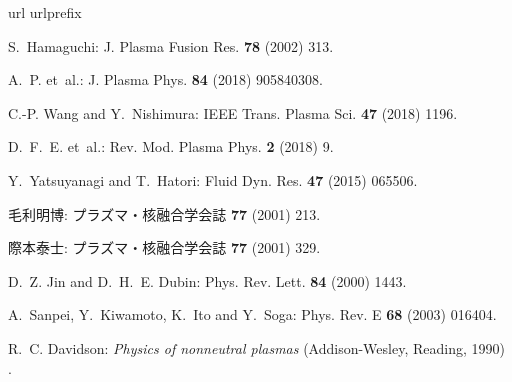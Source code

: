 \documentclass{jspf}            %
\begin{document}
%
%
\begin{thebibliography}{10}
\expandafter\ifx\csname url\endcsname\relax
  \def\url#1{\texttt{#1}}\fi
\expandafter\ifx\csname urlprefix\endcsname\relax\def\urlprefix{URL }\fi

S.~Hamaguchi: J. Plasma Fusion Res. {\bf 78} (2002) 313.

A.~P. et~al.: J. Plasma Phys. {\bf 84} (2018) 905840308.

C.-P. Wang and Y.~Nishimura: IEEE Trans. Plasma Sci. {\bf 47} (2018) 1196.

D.~F.~E. et~al.: Rev. Mod. Plasma Phys. {\bf 2} (2018) 9.

Y.~Yatsuyanagi and T.~Hatori: Fluid Dyn. Res. {\bf 47} (2015) 065506.

毛利明博: プラズマ・核融合学会誌 {\bf 77} (2001) 213.

際本泰士: プラズマ・核融合学会誌 {\bf 77} (2001) 329.

D.~Z. Jin and D.~H.~E. Dubin: Phys. Rev. Lett. {\bf 84} (2000) 1443.

A.~Sanpei, Y.~Kiwamoto, K.~Ito and Y.~Soga: Phys. Rev. E {\bf 68} (2003)
  016404.

R.~C. Davidson: {\em Physics of nonneutral plasmas} (Addison-Wesley, Reading,
  1990) .

\end{thebibliography}
\end{document}
